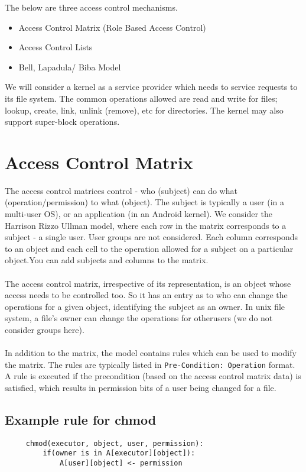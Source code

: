 \documentclass[11pt]{article} %
\begin{document}
The below are three access control mechanisms.
\begin{itemize} \itemsep -2pt  %
\item Access Control Matrix (Role Based Access Control)
\item Access Control Lists
\item Bell,  Lapadula/ Biba Model
\end{itemize}

We will consider a kernel as a service provider which needs to service requests to its
file system. The common operations allowed are read and write for files; lookup, create,
link, unlink (remove), etc for directories. The kernel may also support super-block
operations.

\section{Access Control Matrix}
The access control matrices control - who (subject) can do what (operation/permission) to
what (object). The subject is typically a user (in a multi-user OS), or an application (in
an Android kernel). We consider the Harrison Rizzo Ullman model, where each row in the
matrix corresponds to a subject - a single user. User groups are not considered. Each 
column corresponds to an object and each cell to the operation allowed for a subject on a
particular object.You can add subjects and columns to the matrix.\\
\\
The access control matrix, irrespective of its representation, is an object whose access
needs to be controlled too. So it has an entry as to who can change the operations for
a given object, identifying the subject as an owner. In unix file system, a file's owner can
change the operations for otherusers (we do not consider groups here). \\
\\
In addition to the matrix, the model contains rules which can be used to modify the
matrix. The rules are typically listed in \texttt{Pre-Condition: Operation} format. A
rule is executed if the precondition (based on the access control matrix data) is satisfied,
which results in permission bits of a user being changed for a file.
\subsection{Example rule for chmod}
\begin{verbatim}
     chmod(executor, object, user, permission):
         if(owner is in A[executor][object]):
             A[user][object] <- permission
\end{verbatim}
\end{document}
